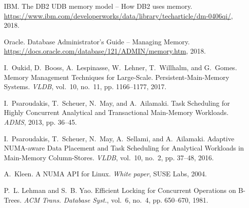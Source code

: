 \documentclass[11pt]{article}
\begin{document}
\begin{thebibliography}{10}
\begin{small}
IBM. \newblock The DB2 UDB memory model -- How DB2 uses memory. \newblock \url{https://www.ibm.com/developerworks/data/library/techarticle/dm-0406qi/}, 2018.

Oracle. \newblock Database Administrator’s Guide -- Managing Memory. \newblock \url{https://docs.oracle.com/database/121/ADMIN/memory.htm}, 2018.

I.~Oukid, D.~Booss, A.~Lespinasse, W.~Lehner, T.~Willhalm, and G.~Gomes. \newblock Memory Management Techniques for Large-Scale. Persistent-Main-Memory Systems. \newblock \emph{VLDB}, vol.~10, no.~11, pp. 1166--1177, 2017.

I.~Psaroudakis, T.~Scheuer, N.~May, and A.~Ailamaki. \newblock Task Scheduling for Highly Concurrent Analytical and Transactional Main-Memory Workloads. \newblock \emph{ADMS}, 2013, pp. 36--45.

I.~Psaroudakis, T.~Scheuer, N.~May, A.~Sellami, and A.~Ailamaki. \newblock Adaptive NUMA-aware Data Placement and Task Scheduling for Analytical Workloads in Main-Memory Column-Stores. \newblock \emph{VLDB}, vol.~10, no.~2, pp. 37--48, 2016.

A.~Kleen. \newblock A NUMA API for Linux. \newblock \emph{White paper}, SUSE Labs, 2004.

P.~L. Lehman and S.~B. Yao. \newblock Efficient Locking for Concurrent Operations on B-Trees. \newblock \emph{ACM Trans. Database Syst.}, vol.~6, no.~4, pp. 650--670, 1981.
\end{small}
\end{thebibliography}
\end{document}
